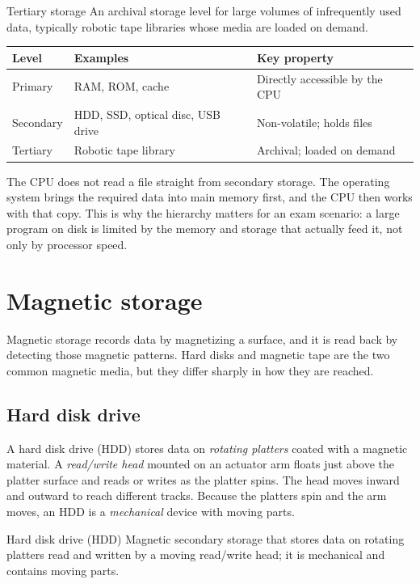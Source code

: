 \begin{definitionbox}{Tertiary storage}
An archival storage level for large volumes of infrequently used data,
typically robotic tape libraries whose media are loaded on demand.
\end{definitionbox}

\begin{center}
\begin{tabular}{p{}p{}p{}}
\toprule
\textbf{Level} & \textbf{Examples} & \textbf{Key property}\\
\midrule
Primary & RAM, ROM, cache & Directly accessible by the CPU\\
Secondary & HDD, SSD, optical disc, USB drive & Non-volatile; holds files\\
Tertiary & Robotic tape library & Archival; loaded on demand\\
\bottomrule
\end{tabular}
\end{center}

The CPU does not read a file straight from secondary storage. The operating
system brings the required data into main memory first, and the CPU then works
with that copy. This is why the hierarchy matters for an exam scenario: a
large program on disk is limited by the memory and storage that actually feed
it, not only by processor speed.

\section{Magnetic storage}
Magnetic storage records data by magnetizing a surface, and it is read back by
detecting those magnetic patterns. Hard disks and magnetic tape are the two
common magnetic media, but they differ sharply in how they are reached.

\subsection{Hard disk drive}
A hard disk drive (HDD) stores data on \emph{rotating platters} coated with a
magnetic material. A \emph{read/write head} mounted on an actuator arm floats
just above the platter surface and reads or writes as the platter spins. The
head moves inward and outward to reach different tracks. Because the platters
spin and the arm moves, an HDD is a \emph{mechanical} device with moving parts.

\begin{definitionbox}{Hard disk drive (HDD)}
Magnetic secondary storage that stores data on rotating platters read and
written by a moving read/write head; it is mechanical and contains moving
parts.
\end{definitionbox}

